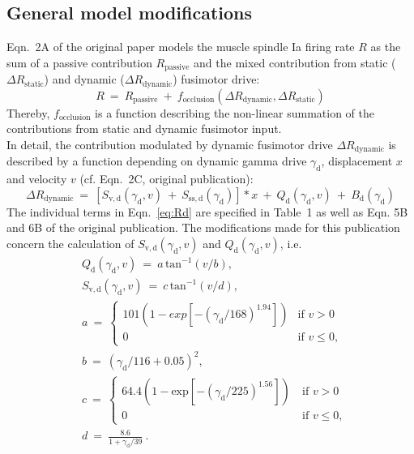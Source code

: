\documentclass[fleqn,10pt]{physiome}
\begin{document}
\subsection{General model modifications}\label{sec:mod_matlab}
Eqn.~2A of the original paper models the muscle spindle Ia firing rate $R$ as the sum of a passive contribution $R_{\mathrm{passive}}$ and the mixed contribution from static ($\Delta R_{\mathrm{static}}$) and dynamic ($\Delta R_{\mathrm{dynamic}}$) fusimotor drive:
%
\begin{equation}
    R \ = \ R_{\mathrm{passive}} \ + \ f_{\mathrm{occlusion}}\left( \Delta R_{\mathrm{dynamic}},\Delta R_{\mathrm{static}} \right)
\end{equation}
%
Thereby, $f_{\mathrm{occlusion}}$ is a function describing the non-linear summation of the contributions from static and dynamic fusimotor input. \\
In detail, the contribution modulated by dynamic fusimotor drive $\Delta R_{\mathrm{dynamic}}$ is described by a function depending on dynamic gamma drive $\gamma_\mathrm{d}$, displacement $x$ and velocity $v$ (cf. Eqn.~2C, original publication):
%
\begin{equation}
\Delta R_{\mathrm{dynamic}} \ = \ \left[ S_\mathrm{v,d}(\gamma_\mathrm{d},v) \ + \ S_\mathrm{ss,d}(\gamma_\mathrm{d}) \right] * x \ + \  Q_\mathrm{d}(\gamma_\mathrm{d},v) \ + \ B_\mathrm{d}(\gamma_\mathrm{d})
\label{eq:Rd}
\end{equation}
%
The individual terms in Eqn.~\ref{eq:Rd} are specified in Table~1 as well as Eqn. 5B and 6B of the original publication.
The modifications made for this publication concern the calculation of $S_\mathrm{v,d}(\gamma_\mathrm{d},v)$ and $Q_\mathrm{d}(\gamma_\mathrm{d},v)$, i.e.
%
\begin{align}
&Q_\mathrm{d}(\gamma_\mathrm{d},v) \  = \  a \,  \mathrm{tan}^{-1}(v/b), \\
&S_\mathrm{v,d}(\gamma_\mathrm{d},v) \ = \ c \,  \mathrm{tan}^{-1}(v/d), \\
& a  \ = \ \begin{cases}
                    101 \left(1-exp \left[- \left(\gamma_\mathrm{d} / 168 \right)^{1.94}\right] \right) & \text{if $v>0$} \\
                    0\  & \text{if $v \leq 0$},
                    \end{cases}\\
& b \ = \ \left(\gamma_\mathrm{d}/116+0.05 \right)^2 ,\\    
& c  \ = \ \begin{cases}
                    64.4 \left(1-\textrm{exp} \left[- \left(\gamma_\mathrm{d} / 225 \right)^{1.56}\right] \right) \  & \text{if $v>0$}\\
                    0 \  & \text{if $v \leq 0$},
                    \end{cases}\\
                    & d \ = \ \frac{8.6}{1+\gamma_\mathrm{d} / 39} \ .
\end{align}
\end{document}
